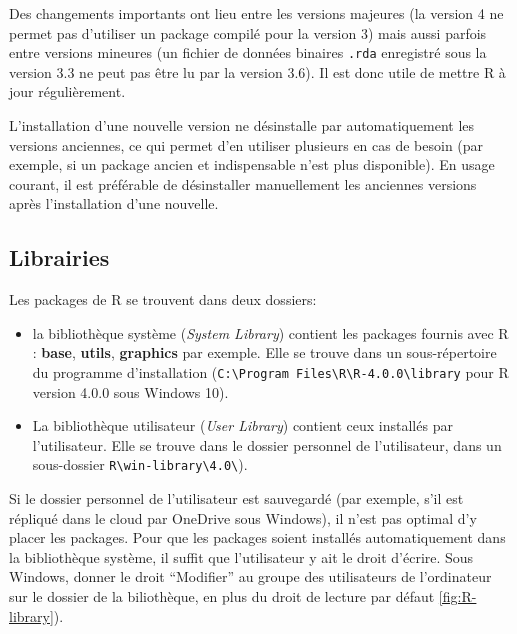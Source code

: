 \documentclass[
  11pt,
  french,
  a4paper,
  extrafontsizes,onecolumn,openright
  ]{memoir}
\providecommand{\tightlist}{%
  \setlength{\itemsep}{0pt}\setlength{\parskip}{0pt}}
\begin{document}
Des changements importants ont lieu entre les versions majeures (la version 4 ne permet pas d'utiliser un package compilé pour la version 3) mais aussi parfois entre versions mineures (un fichier de données binaires \texttt{.rda} enregistré sous la version 3.3 ne peut pas être lu par la version 3.6).
Il est donc utile de mettre R à jour régulièrement.

L'installation d'une nouvelle version ne désinstalle par automatiquement les versions anciennes, ce qui permet d'en utiliser plusieurs en cas de besoin (par exemple, si un package ancien et indispensable n'est plus disponible).
En usage courant, il est préférable de désinstaller manuellement les anciennes versions après l'installation d'une nouvelle.

\hypertarget{sec:librairies}{%
\subsection{Librairies}\label{sec:librairies}}

Les packages de R se trouvent dans deux dossiers:

\begin{itemize}
\tightlist
\item
  la bibliothèque système (\emph{System Library}) contient les packages fournis avec R : \textbf{base}, \textbf{utils}, \textbf{graphics} par exemple.
  Elle se trouve dans un sous-répertoire du programme d'installation (\texttt{C:\textbackslash{}Program\ Files\textbackslash{}R\textbackslash{}R-4.0.0\textbackslash{}library} pour R version 4.0.0 sous Windows 10).
\item
  La bibliothèque utilisateur (\emph{User Library}) contient ceux installés par l'utilisateur.
  Elle se trouve dans le dossier personnel de l'utilisateur, dans un sous-dossier \texttt{R\textbackslash{}win-library\textbackslash{}4.0\textbackslash{}}).
\end{itemize}

Si le dossier personnel de l'utilisateur est sauvegardé (par exemple, s'il est répliqué dans le cloud par OneDrive sous Windows), il n'est pas optimal d'y placer les packages.
Pour que les packages soient installés automatiquement dans la bibliothèque système, il suffit que l'utilisateur y ait le droit d'écrire.
Sous Windows, donner le droit ``Modifier'' au groupe des utilisateurs de l'ordinateur sur le dossier de la biliothèque, en plus du droit de lecture par défaut \ref{fig:R-library}).
\end{document}
